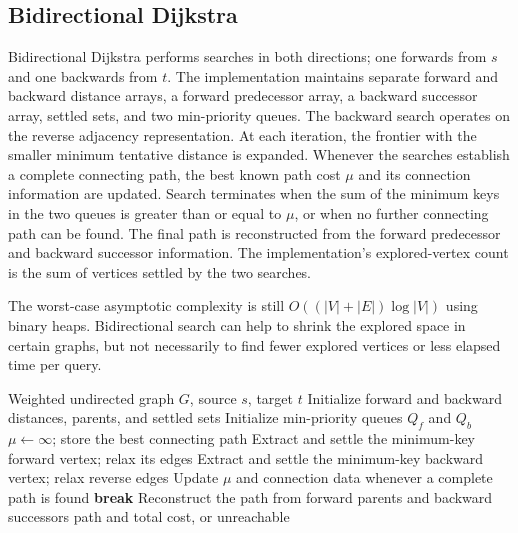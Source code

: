 \documentclass[conference]{IEEEtran}
\begin{document}
\subsection{Bidirectional Dijkstra}
Bidirectional Dijkstra performs searches in both directions; one forwards from $s$ and one backwards from $t$. The implementation maintains separate forward and backward distance arrays, a forward predecessor array, a backward successor array, settled sets, and two min-priority queues. The backward search operates on the reverse adjacency representation. At each iteration, the frontier with the smaller minimum tentative distance is expanded. Whenever the searches establish a complete connecting path, the best known path cost $\mu$ and its connection information are updated. Search terminates when the sum of the minimum keys in the two queues is greater than or equal to $\mu$, or when no further connecting path can be found. The final path is reconstructed from the forward predecessor and backward successor information. The implementation's explored-vertex count is the sum of vertices settled by the two searches.

The worst-case asymptotic complexity is still
$O((|V|+|E|)\log |V|)$ using binary heaps. Bidirectional search can help to shrink the explored space in certain graphs, but not necessarily to find fewer explored vertices or less elapsed time per query.

\begin{algorithm}[t]
\caption{High-level bidirectional Dijkstra outline}
\label{alg:bi}
\begin{algorithmic}[1]
\Require Weighted undirected graph $G$, source $s$, target $t$
\State Initialize forward and backward distances, parents, and settled sets
\State Initialize min-priority queues $Q_f$ and $Q_b$
\State $\mu\gets\infty$; store the best connecting path
        \State Extract and settle the minimum-key forward vertex; relax its edges
    \Else
        \State Extract and settle the minimum-key backward vertex; relax reverse edges
    \EndIf
    \State Update $\mu$ and connection data whenever a complete path is found
        \State \textbf{break}
    \EndIf
\EndWhile
\State Reconstruct the path from forward parents and backward successors
\State \Return path and total cost, or unreachable
\end{algorithmic}
\end{algorithm}
\end{document}
